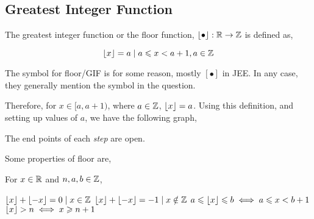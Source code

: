 \subsection{Greatest Integer Function}

The greatest integer function or the floor function, \(\left\lfloor \bullet \right\rfloor : \mathbb R \to \mathbb Z\) is defined
as,
\begin{definition}
    [Floor]
    \[
        \left\lfloor x \right\rfloor = a \mid a \leqslant x < a + 1, a \in \mathbb Z
    \]
\end{definition}

The symbol for floor/GIF is for some reason, mostly \([\bullet]\) in JEE. In any case, they
generally mention the symbol in the question.

Therefore, for \(x \in [a,a+1)\), where \(a \in \mathbb Z\), \(\left\lfloor x \right\rfloor = a\). Using this
definition, and setting up values of \(a\), we have the following graph,

\begin{figure}
    [H]
    \centering
\end{figure}

The end points of each \emph{step} are open. 

Some properties of floor are,

\begin{proposition}
    For \(x \in \mathbb R\) and \(n, a, b \in \mathbb Z\),
    \begin{enumerate}
        \ii \(\left\lfloor x \right\rfloor + \left\lfloor -x \right\rfloor = 0 \mid x \in \mathbb Z\)
        \ii \(\left\lfloor x \right\rfloor + \left\lfloor -x \right\rfloor = -1 \mid x \notin \mathbb Z\)
        \ii \(a \leqslant \left\lfloor x \right\rfloor \leqslant b \iff a \leqslant x < b + 1\)
        \ii \(\left\lfloor x \right\rfloor > n \iff x \geqslant n + 1\) 
    \end{enumerate}
\end{proposition}

